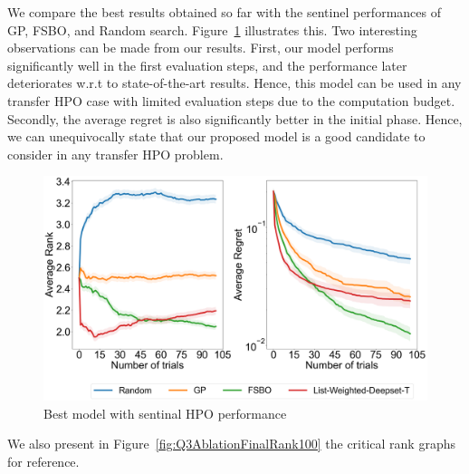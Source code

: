 \documentclass[12pt, twoside, ngerman]{report}
\begin{document}
We compare the best results obtained so far with the sentinel performances of GP,  FSBO,  and Random search. Figure~\ref{fig:Q3AblationFinal} illustrates this.  Two interesting observations can be made from our results. First,  our model performs significantly well in the first evaluation steps, and the performance later deteriorates w.r.t to state-of-the-art results. Hence,  this model can be used in any transfer HPO case with limited evaluation steps due to the computation budget. Secondly,   the average regret is also significantly better in the initial phase. Hence, we can unequivocally state that our proposed model is a good candidate to consider in any transfer HPO problem. 

\begin{figure}[h]
  \centering
    \includegraphics[scale=0.25]{images/Q3AblationFinal}
    \caption{Best model with sentinal HPO performance}
    \label{fig:Q3AblationFinal}
\end{figure}

We also present in Figure~\ref{fig:Q3AblationFinalRank100} the critical rank graphs for reference.
\end{document}
